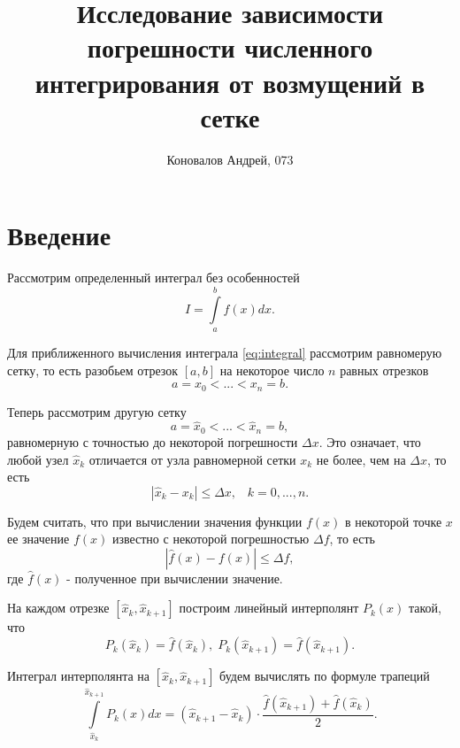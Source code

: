 \documentclass[10pt, twocolumn]{article}
\title{Исследование зависимости погрешности численного интегрирования от возмущений в сетке}
\author{Коновалов Андрей, 073}
\date{}
\begin{document}
\maketitle


\section{Введение}

Рассмотрим определенный интеграл без особенностей
\begin{equation} \label{eq:integral}
  I = \int \limits_a^b f(x) dx.
\end{equation}

Для приближенного вычисления интеграла \eqref{eq:integral} рассмотрим равномерую сетку, то есть разобьем отрезок $[a, b]$ на некоторое число $n$ равных отрезков
\begin{equation} \label{eq:uniform_grid}
  a = x_0 < ... < x_n = b.
\end{equation}

Теперь рассмотрим другую сетку
\begin{equation} \label{eq:bad_grid}
  a = \hat{x}_0 < ... < \hat{x}_n = b,
\end{equation}
равномерную с точностью до некоторой погрешности $\Delta x$. Это означает, что любой узел $\hat{x}_k$ отличается от узла равномерной сетки $x_k$ не более, чем на $\Delta x$, то есть
\begin{equation*}
  |\hat{x}_k - x_k| \leq \Delta x, \;\;\; k = 0, ..., n.
\end{equation*}

Будем считать, что при вычислении значения функции $f(x)$ в некоторой точке $x$ ее значение $f(x)$ известно с некоторой погрешностью $\Delta f$, то есть
\begin{equation*}
  |\hat{f}(x) - f(x)| \leq \Delta f,
\end{equation*}
где $\hat{f}(x)$ - полученное при вычислении значение.

На каждом отрезке $[\hat{x}_k, \hat{x}_{k + 1}]$ построим линейный интерполянт $P_k(x)$ такой, что
\begin{equation*}
  P_k(\hat{x}_k) = \hat{f}(\hat{x}_k), \; P_k(\hat{x}_{k + 1}) = \hat{f}(\hat{x}_{k + 1}).
\end{equation*}

Интеграл интерполянта на $[\hat{x}_k, \hat{x}_{k + 1}]$ будем вычислять по формуле трапеций
\begin{equation*}
  \int \limits_{\hat{x}_k}^{\hat{x}_{k+1}} P_k(x) dx = (\hat{x}_{k + 1} - \hat{x}_k) \cdot \frac{\hat{f}(\hat{x}_{k + 1}) + \hat{f}(\hat{x}_k)}{2}.
\end{equation*}
\end{document}
